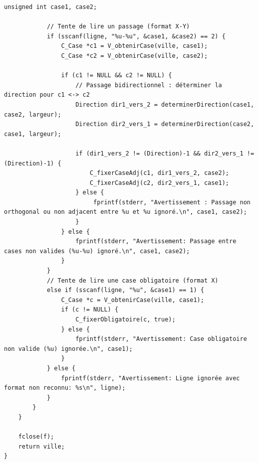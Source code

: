 \begin{lstlisting}[caption={IHM\_chargerVilleDepuisFichier}]
            unsigned int case1, case2;
            
            // Tente de lire un passage (format X-Y)
            if (sscanf(ligne, "%u-%u", &case1, &case2) == 2) {
                C_Case *c1 = V_obtenirCase(ville, case1);
                C_Case *c2 = V_obtenirCase(ville, case2);
                
                if (c1 != NULL && c2 != NULL) {
                    // Passage bidirectionnel : déterminer la direction pour c1 <-> c2
                    Direction dir1_vers_2 = determinerDirection(case1, case2, largeur);
                    Direction dir2_vers_1 = determinerDirection(case2, case1, largeur);

                    if (dir1_vers_2 != (Direction)-1 && dir2_vers_1 != (Direction)-1) {
                        C_fixerCaseAdj(c1, dir1_vers_2, case2);
                        C_fixerCaseAdj(c2, dir2_vers_1, case1);
                    } else {
                         fprintf(stderr, "Avertissement : Passage non orthogonal ou non adjacent entre %u et %u ignoré.\n", case1, case2);
                    }
                } else {
                    fprintf(stderr, "Avertissement: Passage entre cases non valides (%u-%u) ignoré.\n", case1, case2);
                }
            } 
            // Tente de lire une case obligatoire (format X)
            else if (sscanf(ligne, "%u", &case1) == 1) {
                C_Case *c = V_obtenirCase(ville, case1);
                if (c != NULL) {
                    C_fixerObligatoire(c, true);
                } else {
                    fprintf(stderr, "Avertissement: Case obligatoire non valide (%u) ignorée.\n", case1);
                }
            } else {
                fprintf(stderr, "Avertissement: Ligne ignorée avec format non reconnu: %s\n", ligne);
            }
        }
    }

    fclose(f);
    return ville;
}
\end{lstlisting}


